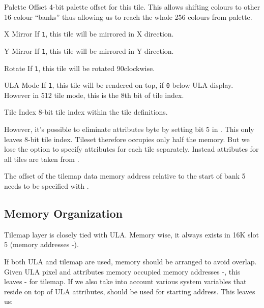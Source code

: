 \documentclass[12pt,twoside,openright,a4paper]{book}
\begin{document}
\begin{basedescript}{
	\desclabelstyle{\multilinelabel}
	\desclabelwidth{3cm}}
	\setlength\itemsep{0pt}

	\newcommand{\RightItem}[1]{\item[#1]}

	\RightItem{Palette Offset} 4-bit palette offset for this tile. This allows shifting colours to other 16-colour ``banks'' thus allowing us to reach the whole 256 colours from palette.
	
	\RightItem{X Mirror} If {\tt 1}, this tile will be mirrored in X direction.

	\RightItem{Y Mirror} If {\tt 1}, this tile will be mirrored in Y direction.
	
	\RightItem{Rotate} If {\tt 1}, this tile will be rotated 90\Deg clockwise.
	
	\RightItem{ULA Mode} If {\tt 1}, this tile will be rendered on top, if {\tt 0} below ULA display. However in 512 tile mode, this is the 8th bit of tile index.
	
	\RightItem{Tile Index} 8-bit tile index within the tile definitions.
\end{basedescript}

However, it's possible to eliminate attributes byte by setting bit 5 in . This only leaves 8-bit tile index. Tileset therefore occupies only half the memory. But we lose the option to specify attributes for each tile separately. Instead attributes for all tiles are taken from .

The offset of the tilemap data memory address relative to the start of bank 5 needs to be specified with .


\subsection{Memory Organization}

Tilemap layer is closely tied with ULA. Memory wise, it always exists in 16K slot 5 (memory addresses -).

If both ULA and tilemap are used, memory should be arranged to avoid overlap. Given ULA pixel and attributes memory occupied memory addresses -, this leaves - for tilemap. If we also take into account various system variables that reside on top of ULA attributes,  should be used for starting address. This leaves us:
\end{document}
